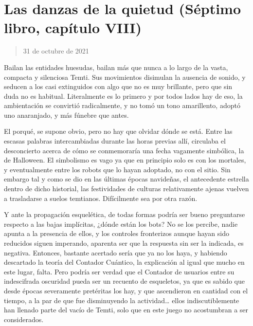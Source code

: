 \documentclass[
]{book}
\begin{document}
\hypertarget{las-danzas-de-la-quietud-suxe9ptimo-libro-capuxedtulo-viii}{%
\section{Las danzas de la quietud (Séptimo libro, capítulo VIII)}\label{las-danzas-de-la-quietud-suxe9ptimo-libro-capuxedtulo-viii}}

\begin{quote}
31 de octubre de 2021
\end{quote}

Bailan las entidades huesudas, bailan más que nunca a lo largo de la vasta, compacta y silenciosa Temti. Sus movimientos disimulan la ausencia de sonido, y seducen a los casi extinguidos con algo que no es muy brillante, pero que sin duda no es habitual. Literalmente es lo primero y por todos lados hay de eso, la ambientación se convirtió radicalmente, y no tomó un tono amarillento, adoptó uno anaranjado, y más fúnebre que antes.

El porqué, se supone obvio, pero no hay que olvidar dónde se está. Entre las escasas palabras intercambiadas durante las horas previas allí, circulaba el desconcierto acerca de cómo se conmemoraría una fecha vagamente simbólica, la de Halloween. El simbolismo es vago ya que en principio solo es con los mortales, y eventualmente entre los robots que lo hayan adoptado, no con el sitio. Sin embargo tal y como se dio en las últimas épocas navideñas, el antecedente estrella dentro de dicho historial, las festividades de culturas relativamente ajenas vuelven a trasladarse a suelos temtianos. Difícilmente sea por otra razón.

Y ante la propagación esquelética, de todas formas podría ser bueno preguntarse respecto a las bajas implícitas, ¿dónde están los bots? No se los percibe, nadie apunta a la presencia de ellos, y los controles fronterizos aunque hayan sido reducidos siguen imperando, aparenta ser que la respuesta sin ser la indicada, es negativa. Entonces, bastante acertado sería que ya no los haya, y habiendo descartado la teoría del Contador Cuántico, la explicación al igual que mucho en este lugar, falta. Pero podría ser verdad que el Contador de usuarios entre su indescifrada oscuridad pueda ser un recuento de esqueletos, ya que es sabido que desde épocas severamente pretéritas los hay, y que ascendieron en cantidad con el tiempo, a la par de que fue disminuyendo la actividad\ldots{} ellos indiscutiblemente han llenado parte del vacío de Temti, solo que en este juego no acostumbran a ser considerados.
\end{document}
